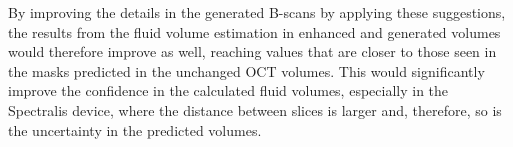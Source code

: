 \par
By improving the details in the generated B-scans by applying these suggestions, the results from the fluid volume estimation in enhanced and generated volumes would therefore improve as well, reaching values that are closer to those seen in the masks predicted in the unchanged OCT volumes. This would significantly improve the confidence in the calculated fluid volumes, especially in the Spectralis device, where the distance between slices is larger and, therefore, so is the uncertainty in the predicted volumes.
